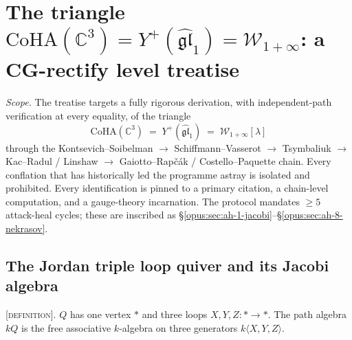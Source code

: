 \section{The triangle $\mathrm{CoHA}(\mathbb{C}^3) = Y^+(\widehat{\mathfrak{gl}}_1) = \mathcal{W}_{1+\infty}$: a CG-rectify level treatise}
\label{opus:sec:coha-yangian-winf-triangle}

\providecommand{\ClaimStatusTheorem}{\textsc{[theorem, cited]}}
\providecommand{\ClaimStatusConjectured}{\textsc{[conjectural]}}
\providecommand{\ClaimStatusDefinition}{\textsc{[definition]}}
\providecommand{\ClaimStatusDerivation}{\textsc{[first-principles derivation]}}
\providecommand{\ClaimStatusOpen}{\textsc{[open]}}
\providecommand{\CoHA}{\mathrm{CoHA}}
\providecommand{\Sh}{\mathrm{Sh}}
\providecommand{\Wilpha}{\mathcal{W}_{1+\infty}}
\providecommand{\gghone}{\widehat{\mathfrak{gl}}_1}
\providecommand{\hCS}{\mathrm{hCS}}
\providecommand{\Jac}{J}
\providecommand{\Fact}{\mathrm{Fact}}
\providecommand{\Crit}{\mathrm{Crit}}
\providecommand{\Hilb}{\mathrm{Hilb}}
\providecommand{\Obs}{\mathrm{Obs}}
\providecommand{\eps}{\epsilon}
\providecommand{\Zinst}{Z^{\mathrm{inst}}_{\Omega}}

\emph{Scope.} The treatise targets a fully rigorous derivation, with
independent-path verification at every equality, of the triangle
\[
 \CoHA(\mathbb{C}^3) \;=\; Y^+(\gghone) \;=\; \Wilpha[\lambda]
\]
through the Kontsevich--Soibelman $\to$ Schiffmann--Vasserot $\to$
Tsymbaliuk $\to$ Kac--Radul / Linshaw $\to$ Gaiotto--Rap\v c\'ak /
Costello--Paquette chain. Every conflation that has historically led
the programme astray is isolated and prohibited. Every identification is
pinned to a primary citation, a chain-level computation, and a gauge-theory
incarnation. The protocol mandates $\geq 5$ attack-heal cycles; these are
inscribed as \S\ref{opus:sec:ah-1-jacobi}--\S\ref{opus:sec:ah-8-nekrasov}.

\subsection{The Jordan triple loop quiver and its Jacobi algebra}
\label{opus:sec:jordan-triple-quiver}

\begin{definition}
\label{opus:def:jordan-triple-quiver}
\ClaimStatusDefinition. $Q$ has one vertex $*$ and three loops $X, Y, Z : * \to *$.
The path algebra $kQ$ is the free associative $k$-algebra on three
generators $k\langle X, Y, Z\rangle$.
\end{definition}

